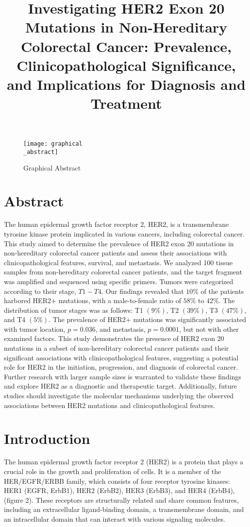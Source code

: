 \documentclass[12pt]{article}
\title{\huge Investigating HER2 Exon 20 Mutations in Non-Hereditary Colorectal Cancer: Prevalence, Clinicopathological Significance, and Implications for Diagnosis and Treatment}
\begin{document}
\tableofcontents
\maketitle

\begin{figure}[h]
\texttt{[image: graphical\\\_abstract]}\\
\caption{Graphical Abstract}
\end{figure}

\section{Abstract}
The human epidermal growth factor receptor 2, HER2, is a transmembrane tyrosine kinase protein implicated in various cancers, including colorectal cancer. This study aimed to determine the prevalence of HER2 exon 20 mutations in non-hereditary colorectal cancer patients and assess their associations with clinicopathological features, survival, and metastasis.
We analyzed 100 tissue samples from non-hereditary colorectal cancer patients, and the target fragment was amplified and sequenced using specific primers. Tumors were categorized according to their stage, ${T1-T4}$. Our findings revealed that ${10\%}$ of the patients harbored HER2+ mutations, with a male-to-female ratio of ${58\%}$ to ${42\%}$. The distribution of tumor stages was as follows: T1 ${(9\%)}$, T2 ${(39\%)}$, T3 ${(47\%)}$, and T4 ${(5\%)}$. The prevalence of HER2+ mutations was significantly associated with tumor location, ${p=0.036}$,  and metastasis, ${p=0.0001}$, but not with other examined factors. This study demonstrates the presence of HER2 exon 20 mutations in a subset of non-hereditary colorectal cancer patients and their significant associations with clinicopathological features, suggesting a potential role for HER2 in the initiation, progression, and diagnosis of colorectal cancer.
Further research with larger sample sizes is warranted to validate these findings and explore HER2 as a diagnostic and therapeutic target. Additionally, future studies should investigate the molecular mechanisms underlying the observed associations between HER2 mutations and clinicopathological features.


\section{Introduction}

The human epidermal growth factor receptor 2 (HER2) is a protein that plays a crucial role in the growth and proliferation of cells. It is a member of the HER/EGFR/ERBB family, which consists of four receptor tyrosine kinases: HER1 (EGFR, ErbB1), HER2 (ErbB2), HER3 (ErbB3), and HER4 (ErbB4),(figure 2). These receptors are structurally related and share common features, including an extracellular ligand-binding domain, a transmembrane domain, and an intracellular domain that can interact with various signaling molecules.
\end{document}
